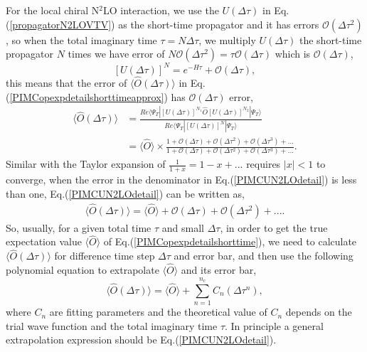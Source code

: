 \documentclass[12pt,letterpaper,UTF8]{report}
\begin{document}
For the local chiral N$^2$LO interaction, we use the $U(\Delta \tau)$ in Eq.(\ref{propagatorN2LOVTV}) as the short-time propagator and it has errors $\mathcal{O}(\Delta \tau^2)$, so when the total imaginary time $\tau=N\Delta \tau$, we multiply $U(\Delta \tau)$ the short-time propagator $N$ times we have error of $N\mathcal{O}(\Delta \tau^2)=\tau \mathcal{O}(\Delta \tau)$ which is $\mathcal{O}(\Delta \tau)$,
\begin{equation}
\left[U(\Delta \tau)\right]^N = e^{-H \tau} + \mathcal{O}(\Delta \tau),
\label{propagatorNerrstruc}
\end{equation}
this means that the error of $\langle \hat{O} (\Delta \tau) \rangle$ in Eq.(\ref{PIMCopexpdetailshorttimeapprox}) has $\mathcal{O}(\Delta \tau)$ error,
\begin{align}
\langle \hat{O} (\Delta \tau) \rangle
& = \frac{ Re  \langle \Psi_T| [U(\Delta \tau)]^{N_1} \hat{O} [U(\Delta \tau)]^{N_2}| \Psi_T \rangle  }
{ Re \langle \Psi_T| [U(\Delta \tau)]^N | \Psi_T \rangle} \nonumber \\
& = \langle \hat{O} \rangle \times
\frac{1 + \mathcal{O}(\Delta \tau) + \mathcal{O}(\Delta \tau^2) + \mathcal{O}(\Delta \tau^3) + ... }
{1+ \mathcal{O}(\Delta \tau) + \mathcal{O}(\Delta \tau^2) + \mathcal{O}(\Delta \tau^3) + ... } .
\label{PIMCUN2LOdetail}
\end{align}
Similar with the Taylor expansion of $\frac{1}{1+x}=1-x+...$ requires $|x|<1$ to converge,
when the error in the denominator in Eq.(\ref{PIMCUN2LOdetail}) is less than one,  Eq.(\ref{PIMCUN2LOdetail}) can be written as,
\begin{align}
\langle \hat{O} (\Delta \tau) \rangle
= \langle \hat{O} \rangle
+ \mathcal{O}(\Delta \tau) + \mathcal{O}(\Delta \tau^2) + ... .
\end{align}
So, usually, for a given total time $\tau$ and small $\Delta \tau$, in order to get the true expectation value $\langle \hat{O} \rangle$ of Eq.(\ref{PIMCopexpdetailshorttime}), we need to calculate $\langle \hat{O} (\Delta \tau) \rangle$ for difference time step $\Delta \tau$ and error bar, and then use the following polynomial equation to extrapolate $\langle \hat{O} \rangle$ and its error bar,
\begin{equation}
\langle \hat{O} (\Delta \tau) \rangle
= \langle \hat{O} \rangle
+ \sum_{n=1}^{n_c} C_{n} (\Delta \tau^{n}),
\label{ON2LOextrapolation}
\end{equation}
where $C_n$ are fitting parameters and the theoretical value of $C_{n}$ depends on the trial wave function and the total imaginary time $\tau$. In principle a general extrapolation expression should be Eq.(\ref{PIMCUN2LOdetail}).
\end{document}
